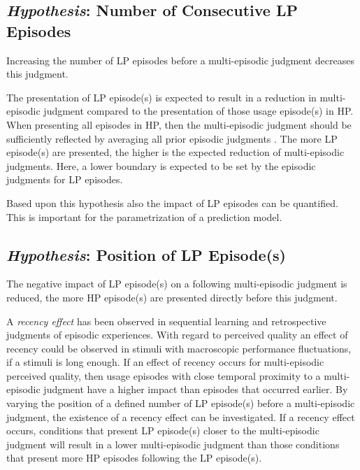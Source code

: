 \subsection[H1: Number of Consecutive \acs{LP} Episodes]{\emph{Hypothesis}: Number of Consecutive \acs{LP} Episodes}
\begin{hypothesis}\label{hypo:number}
Increasing the number of \ac{LP} episodes before a multi-episodic judgment decreases this judgment.
\end{hypothesis}

The presentation of \ac{LP} episode(s) is expected to result in a reduction in multi-episodic judgment compared to the presentation of those usage episode(s) in \ac{HP}.
When presenting all episodes in \ac{HP}, then the multi-episodic judgment should be sufficiently reflected by averaging all prior episodic judgments \citep[\cf,][]{moller_single-call_2011}.
The more \ac{LP} episode(s) are presented, the higher is the expected reduction of multi-episodic judgments.
Here, a lower boundary is expected to be set by the episodic judgments for \ac{LP} episodes.

Based upon this hypothesis also the impact of \ac{LP} episodes can be quantified.
This is important for the parametrization of a prediction model.


\subsection[H2: Position of \acs{LP} Episode(s)]{\emph{Hypothesis}: Position of \acs{LP} Episode(s)}
\begin{hypothesis}\label{hypo:position}


The negative impact of \ac{LP} episode(s) on a following multi-episodic judgment is reduced, the more \ac{HP} episode(s) are presented directly before this judgment.
\end{hypothesis}

A \emph{recency effect} has been observed in sequential learning and retrospective judgments of episodic experiences.
With regard to perceived quality an effect of recency could be observed in stimuli with macroscopic performance fluctuations, if a stimuli is long enough.
If an effect of recency occurs for multi-episodic perceived quality, then usage episodes with close temporal proximity to a multi-episodic judgment have a higher impact than episodes that occurred earlier.
By varying the position of a defined number of \ac{LP} episode(s) before a multi-episodic judgment, the existence of a recency effect can be investigated.
If a recency effect occurs, conditions that present \ac{LP} episode(s) closer to the multi-episodic judgment will result in a lower multi-episodic judgment than those conditions that present more \ac{HP} episodes following the \ac{LP} episode(s).

